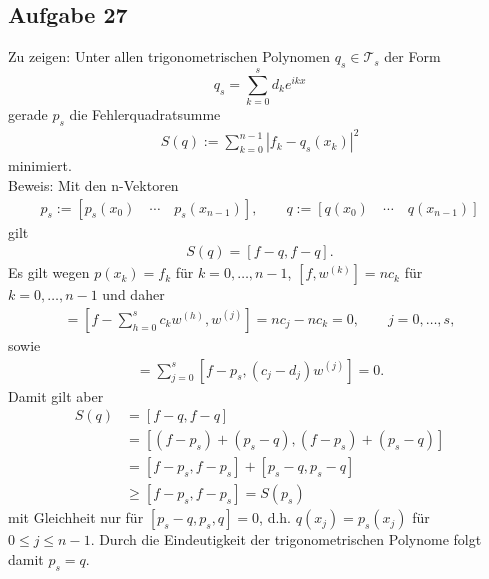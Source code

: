 \subsection*{Aufgabe 27}
Zu zeigen: Unter allen trigonometrischen Polynomen $q_s \in \mathcal{T}_s$ der Form
\[
	q_s= \sum_{k=0}^{s}d_ke^{ikx}
\]
gerade $p_s$ die Fehlerquadratsumme
\begin{align*}
	S(q):=\sum_{k=0}^{n-1}|f_k - q_s(x_k)|^2
\end{align*}
minimiert.\\ \newline
Beweis: Mit den n-Vektoren
\begin{align*}
	p_s := [p_s(x_0)\quad \cdots \quad p_s(x_{n-1})], \qquad q:=[q(x_0) \quad \cdots \quad q(x_{n-1})]
\end{align*}
gilt
\begin{align*}
	S(q)=[f-q,f-q].
\end{align*}
Es gilt wegen $p(x_k)=f_k$ für $k=0, \dots ,n-1$, $[f,w^{(k)}]=nc_k$ für $k=0, \dots ,n-1$ und daher
\begin{align*}
	[f-p_s,w^{(k)}] = [f-\sum_{h=0}^{s}c_kw^{(h)}, w^{(j)}]=nc_j-nc_k=0,\qquad j=0, \dots ,s,
\end{align*}
sowie
\begin{align*}
	[f-p_s,p_s-q] = \sum_{j=0}^{s}[f-p_s,(c_j-d_j)w^{(j)}]=0.
\end{align*}
Damit gilt aber
\begin{align*}
	S(q) &= [f-q,f-q]\\
	&= [(f-p_s)+(p_s-q),(f-p_s)+(p_s-q)]\\
	&= [f-p_s,f-p_s]+[p_s-q,p_s-q]\\
	&\geq [f-p_s,f-p_s] = S(p_s)
\end{align*}
mit Gleichheit nur für $[p_s-q,p_s,q]=0$, d.h. $q(x_j)=p_s(x_j)$ für $0 \leq j \leq n-1$. Durch die Eindeutigkeit der trigonometrischen Polynome folgt damit $p_s=q$.